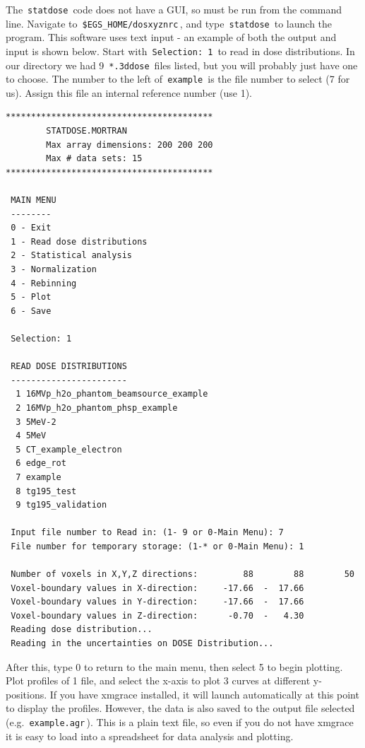 \documentclass[12pt,twoside]{article}
\begin{document}
The \,\Verb|statdose|\, code does not have a GUI, so must be run from the command line. Navigate to \,\Verb|$EGS_HOME/dosxyznrc|\,, and type \,\Verb|statdose|\, to launch the program. This software uses text input - an example of both the output and input is shown below. Start with \,\Verb|Selection: 1|\, to read in dose distributions. In our directory we had 9 \,\Verb|*.3ddose|\, files listed, but you will probably just have one to choose. The number to the left of \,\Verb|example|\, is the file number to select (7 for us). Assign this file an internal reference number (use 1).

{\scriptsize
\begin{lstlisting}[language={},backgroundcolor=\color{white}]
*****************************************
        STATDOSE.MORTRAN
        Max array dimensions: 200 200 200
        Max # data sets: 15
*****************************************

 MAIN MENU
 --------
 0 - Exit
 1 - Read dose distributions
 2 - Statistical analysis
 3 - Normalization
 4 - Rebinning
 5 - Plot
 6 - Save

 Selection: 1

 READ DOSE DISTRIBUTIONS
 -----------------------
  1 16MVp_h2o_phantom_beamsource_example
  2 16MVp_h2o_phantom_phsp_example
  3 5MeV-2
  4 5MeV
  5 CT_example_electron
  6 edge_rot
  7 example
  8 tg195_test
  9 tg195_validation

 Input file number to Read in: (1- 9 or 0-Main Menu): 7
 File number for temporary storage: (1-* or 0-Main Menu): 1

 Number of voxels in X,Y,Z directions:         88        88        50
 Voxel-boundary values in X-direction:     -17.66  -  17.66
 Voxel-boundary values in Y-direction:     -17.66  -  17.66
 Voxel-boundary values in Z-direction:      -0.70  -   4.30
 Reading dose distribution...
 Reading in the uncertainties on DOSE Distribution...
\end{lstlisting}
}

After this, type 0 to return to the main menu, then select 5 to begin plotting. Plot profiles of 1 file, and select the x-axis to plot 3 curves at different y-positions. If you have xmgrace installed, it will launch automatically at this point to display the profiles. However, the data is also saved to the output file selected (e.g. \,\Verb|example.agr|\,). This is a plain text file, so even if you do not have xmgrace it is easy to load into a spreadsheet for data analysis and plotting.
\end{document}
